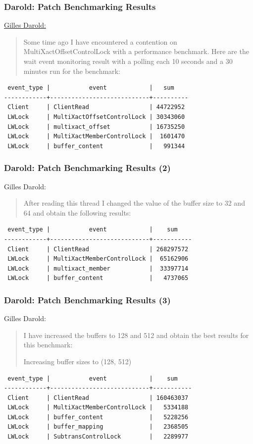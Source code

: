 \begin{frame}[fragile]
  \frametitle{Darold: Patch Benchmarking Results}
  \href{https://postgr.es/m/6ba7eae2-8b0c-0690-11a5-e921e6586180@darold.net}{Gilles Darold:}
  \linksize
  \begin{quote}
    Some time ago I have encountered a contention on MultiXactOffsetControlLock
    with a performance benchmark. Here are the wait event monitoring result with
    a polling each 10 seconds and a 30 minutes run for the benchmark:
  \end{quote}
  \begin{verbatim}
 event_type |           event            |   sum
------------+----------------------------+----------
 Client     | ClientRead                 | 44722952
 LWLock     | MultiXactOffsetControlLock | 30343060
 LWLock     | multixact_offset           | 16735250
 LWLock     | MultiXactMemberControlLock |  1601470
 LWLock     | buffer_content             |   991344
\end{verbatim}
\end{frame}


\begin{frame}[fragile]
  \frametitle{Darold: Patch Benchmarking Results (2)}
  Gilles Darold:
  \linksize 
  \begin{quote}
    After reading this thread I changed the value of the buffer size to 32 and 64 and obtain the following results:
  \end{quote}
  \begin{verbatim}
 event_type |           event            |    sum  
------------+----------------------------+-----------
 Client     | ClientRead                 | 268297572
 LWLock     | MultiXactMemberControlLock |  65162906
 LWLock     | multixact_member           |  33397714
 LWLock     | buffer_content             |   4737065
\end{verbatim}
\end{frame}


\begin{frame}[fragile]
  \frametitle{Darold: Patch Benchmarking Results (3)}
   Gilles Darold:
   \linksize 
   \begin{quote}
     I have increased the buffers to 128 and 512 and obtain the best
     results for this benchmark:

     Increasing buffer sizes to (128, 512)
   \end{quote}

   \begin{verbatim}
 event_type |           event            |    sum  
------------+----------------------------+-----------
 Client     | ClientRead                 | 160463037
 LWLock     | MultiXactMemberControlLock |   5334188
 LWLock     | buffer_content             |   5228256
 LWLock     | buffer_mapping             |   2368505
 LWLock     | SubtransControlLock        |   2289977
\end{verbatim}
\end{frame}


